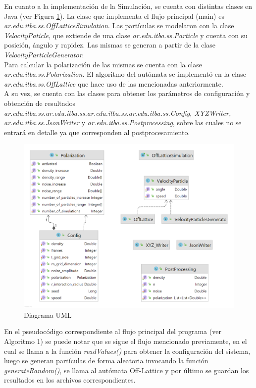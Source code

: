 \documentclass[12pt, a4paper]{report}
\begin{document}
 
En cuanto a la implementación de la Simulación, se cuenta con distintas clases en Java (ver Figura \ref{fig:uml}). La clase que implementa el flujo principal (main) es \emph{ar.edu.itba.ss.OffLatticeSimulation}. Las partículas se modelaron con la clase \emph{VelocityPaticle}, que extiende de una clase \emph{ar.edu.itba.ss.Particle} y cuenta con su posición, ángulo y rapidez. Las mismas se generan a partir de la clase \emph{VelocityParticleGenerator}.\\

Para calcular la polarización de las mismas se cuenta con la clase \emph{ar.edu.itba.ss.Polarization}. El algoritmo del autómata se implementó en la clase \emph{ar.edu.itba.ss.OffLattice} que hace uso de las mencionadas anteriormente.\\

A su vez, se cuenta con las clases para obtener los parámetros de configuración y obtención de resultados \emph{ar.edu.itba.ss.ar.edu.itba.ss.ar.edu.itba.ss.ar.edu.itba.ss.Config, XYZWriter, ar.edu.itba.ss.JsonWriter} y \emph{ar.edu.itba.ss.Postprocessing}, sobre las cuales no se entrará en detalle ya que corresponden al postprocesamiento.

\pagebreak

\begin{figure}[h]
\includegraphics[scale=0.3]{UML.png}
\centering 
\caption{Diagrama UML}
\label{fig:uml}
\end{figure}

En el pseudocódigo correspondiente al flujo principal del programa (ver Algoritmo 1) se puede notar que se sigue el flujo mencionado previamente, en el cual se llama a la función \emph{readValues()} para obtener la configuración del sistema, luego se generan partículas de forma aleatoria invocando la función \emph{generateRandom()}, se llama al autómata Off-Lattice y por último se guardan los resultados en los archivos correspondientes.\\
\end{document}
